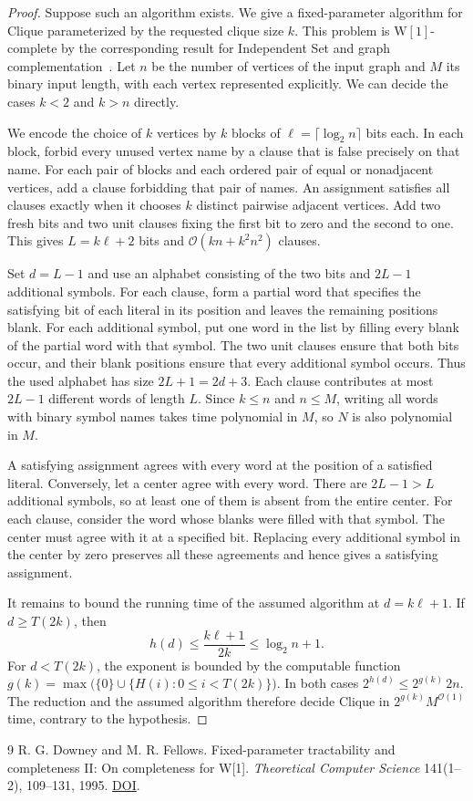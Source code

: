 \documentclass[11pt]{article}
\begin{document}
\begin{proof}
Suppose such an algorithm exists. We give a fixed-parameter algorithm
for Clique parameterized by the requested clique size \(k\). This problem
is \(\mathrm{W[1]}\)-complete by the corresponding result for Independent
Set and graph complementation~\cite{df}. Let \(n\) be the number of
vertices of the input graph and \(M\) its binary input length, with each
vertex represented explicitly. We can decide the cases \(k<2\) and
\(k>n\) directly.

We encode the choice of \(k\) vertices by \(k\) blocks of
\(\ell=\lceil\log_2 n\rceil\) bits each. In each block, forbid every
unused vertex name by a clause that is false precisely on that name.
For each pair of blocks and each ordered pair of equal or nonadjacent
vertices, add a clause forbidding that pair of names. An assignment
satisfies all clauses exactly when it chooses \(k\) distinct pairwise
adjacent vertices. Add two fresh bits and two unit clauses fixing the
first bit to zero and the second to one. This gives \(L=k\ell+2\) bits
and \(\mathcal{O}(kn+k^2n^2)\) clauses.

Set \(d=L-1\) and use an alphabet consisting of the two bits and
\(2L-1\) additional symbols. For each clause, form a partial word that
specifies the satisfying bit of each literal in its position and leaves
the remaining positions blank. For each additional symbol, put one word
in the list by filling every blank of the partial word with that symbol.
The two unit clauses ensure that both bits occur, and their blank positions
ensure that every additional symbol occurs. Thus the used alphabet has
size \(2L+1=2d+3\). Each clause contributes at most \(2L-1\) different
words of length \(L\). Since \(k\le n\) and \(n\le M\), writing all words
with binary symbol names takes time polynomial in \(M\), so \(N\) is
also polynomial in \(M\).

A satisfying assignment agrees with every word at the position of a
satisfied literal. Conversely, let a center agree with every word.
There are \(2L-1>L\) additional symbols, so at least one of them is
absent from the entire center. For each clause, consider the word whose
blanks were filled with that symbol. The center must agree with it at a
specified bit. Replacing every additional symbol in the center by zero
preserves all these agreements and hence gives a satisfying assignment.

It remains to bound the running time of the assumed algorithm at
\(d=k\ell+1\). If \(d\ge T(2k)\), then
\[
 h(d)\le \frac{k\ell+1}{2k}\le \log_2 n+1.
\]
For \(d<T(2k)\), the exponent is bounded by the computable function
\(g(k)=\max\bigl(\{0\}\cup\{H(i):0\le i<T(2k)\}\bigr)\).
In both cases \(2^{h(d)}\le 2^{g(k)}\,2n\). The reduction and the
assumed algorithm therefore decide Clique in \(2^{g(k)}M^{\mathcal{O}(1)}\)
time, contrary to the hypothesis.
\end{proof}

\begin{thebibliography}{9}
 R. G. Downey and M. R. Fellows. Fixed-parameter tractability
and completeness II: On completeness for W[1].
\emph{Theoretical Computer Science} 141(1--2), 109--131, 1995.
\href{https://doi.org/10.1016/0304-3975(94)00097-3}{DOI}.
\end{thebibliography}
\end{document}
